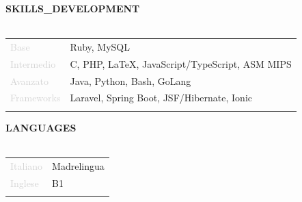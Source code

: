 \documentclass{article}
\begin{document}
\textbf{\textcolor{deepblue}{\uppercase{{{skills_development}}}}} \\\\ \hfill
\begin{tabular}{ R{4cm} l }
	\textcolor{lightgray}{Base}       & Ruby, MySQL                                    \\ \hfill
	\textcolor{lightgray}{Intermedio} & C, PHP, LaTeX, JavaScript/TypeScript, ASM MIPS \\ \hfill
	\textcolor{lightgray}{Avanzato}   & Java, Python, Bash, GoLang                     \\[.5cm] \hfill
	\textcolor{lightgray}{Frameworks} & Laravel, Spring Boot, JSF/Hibernate, Ionic     \\ \hfill
\end{tabular}

\textbf{\textcolor{deepblue}{\uppercase{{{languages}}}}} \\\\ \hfill
\begin{tabular}{ R{4cm} l }
	\textcolor{lightgray}{Italiano} & Madrelingua \\ \hfill
	\textcolor{lightgray}{Inglese}  & B1          \\ \hfill
\end{tabular}
\end{document}
